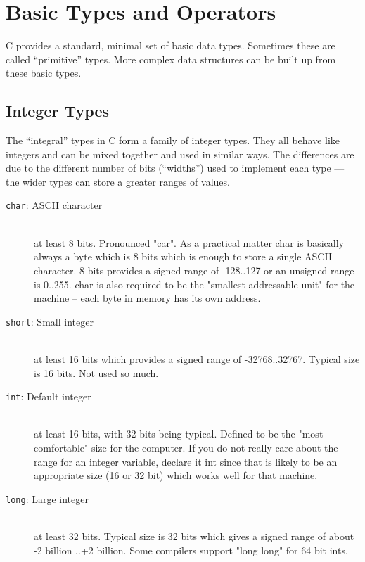 \chapter{Basic Types and Operators}

C provides a standard, minimal set of basic data types. Sometimes these are called ``primitive'' types. More complex data structures can be built up from these basic types.

\section{Integer Types}

The ``integral'' types in C form a family of integer types. They all behave like integers and can be mixed together and used in similar ways. The differences are due to the different number of bits (``widths'') used to implement each type --- the wider types can store a greater ranges of values.

\begin{description}
\item[\lstinline{char}: ASCII character] \hfill \\
    at least 8 bits. Pronounced "car". As a practical matter char is basically always a byte which is 8 bits which is enough to store a single ASCII character. 8 bits provides a signed range of -128..127 or an unsigned range is 0..255. char is also required to be the "smallest addressable unit" for the machine -- each byte in memory has its own address.

\item[\lstinline{short}: Small integer] \hfill \\
    at least 16 bits which provides a signed range of -32768..32767. Typical size is 16 bits. Not used so much.

\item[\lstinline{int}: Default integer] \hfill \\
    at least 16 bits, with 32 bits being typical. Defined to be the "most comfortable" size for the computer. If you do not really care about the range for an integer variable, declare it int since that is likely to be an appropriate size (16 or 32 bit) which works well for that machine.

\item[\lstinline{long}: Large integer] \hfill \\
    at least 32 bits. Typical size is 32 bits which gives a signed range of about -2 billion ..+2 billion. Some compilers support "long long" for 64 bit ints.
\end{description}

